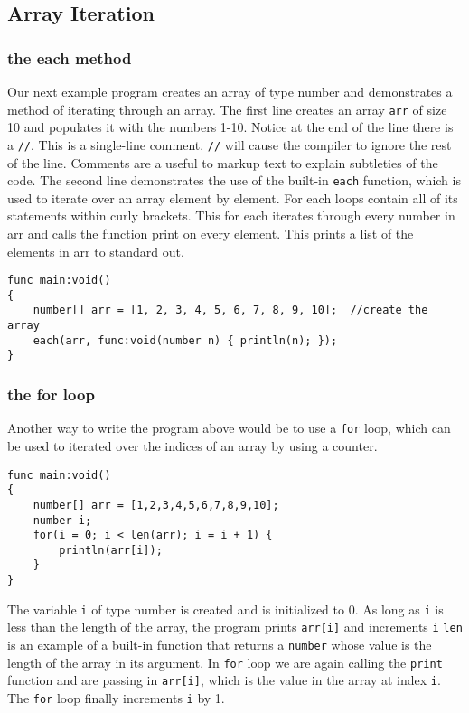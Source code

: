 \subsection{Array Iteration}
\subsubsection{the each method}
Our next example program creates an array of type number and demonstrates a
method of iterating through an array. The first line creates an array \verb=arr=
of size 10 and populates it with the numbers 1-10. Notice at the end of the line
there is a \verb=//=. This is a single-line comment. \verb=//= will cause the
compiler to ignore the rest of the line. Comments are a useful to markup text to
explain subtleties of the code.
The second line demonstrates the use of the built-in \verb=each=
function, which is used to iterate over an array element by element. For each
loops contain all of its statements within curly brackets.  This for each
iterates through every number in arr and calls the function print on every
element. This prints a list of the elements in arr to standard out.

\begin{verbatim}
func main:void()
{
    number[] arr = [1, 2, 3, 4, 5, 6, 7, 8, 9, 10];  //create the array
    each(arr, func:void(number n) { println(n); });
}
\end{verbatim}

\subsubsection{the for loop}
Another way to write the program above would be to use a \verb=for= loop, which
can be used to iterated over the indices of an array by using a counter.

\begin{verbatim}
func main:void()
{
    number[] arr = [1,2,3,4,5,6,7,8,9,10];
    number i;
    for(i = 0; i < len(arr); i = i + 1) {
        println(arr[i]);
    }
}
\end{verbatim}

The variable \verb=i= of type number is created and is initialized to 0. As long
as \verb=i= is less than the length of the array, the program prints
\verb=arr[i]= and increments \verb=i=
\verb=len= is an
example of a built-in function that returns a \verb=number= whose value is the
length of the array in its argument. In \verb=for= loop we are again calling the
\verb=print= function and are passing in \verb=arr[i]=, which is the value in
the array at index \verb=i=. The \verb=for= loop finally increments \verb=i=
by 1.

